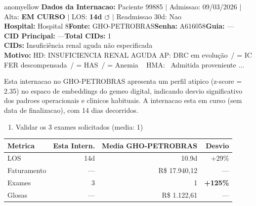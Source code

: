 \documentclass[a4paper,10pt]{article}
\begin{document}
\begin{anomalycard}[Internacao 168228 | GHO-PETROBRAS | MODERADO (z=2.35)]{anomyellow}
\textbf{Dados da Internacao:} Paciente 99885 $\mid$ Admissao: 09/03/2026 $\mid$ Alta: \textcolor{anomorange}{\textbf{EM CURSO}} $\mid$ LOS: \textbf{14d \textcolor{anomorange}{$\circlearrowleft$}} $\mid$ Readmissao 30d: Nao\\
\textbf{Hospital:} Hospital 8\quad\textbf{Fonte:} GHO-PETROBRAS\quad\textbf{Senha:} A616058\quad\textbf{Guia:} ---\\
\textbf{CID Principal:} {\small ---}\quad\textbf{Total CIDs:} 1\\

\textbf{CIDs:} {\scriptsize Insuficiência renal aguda não especificada}\\

\textbf{Motivo:} {\scriptsize HD: INSUFICIENCIA RENAL AGUDA   AP: DRC em evolução / = IC FER descompensada / = HAS / = Anemia    HMA:  Admitida proveniente ...}\\

\vspace{2pt}\begin{tcolorbox}[colback=severityred!20,colframe=anomyellow,title={\textbf{Interpretacao de Negocio}},fonttitle=\bfseries\small,left=4pt,right=4pt,top=3pt,bottom=3pt]
{\small Esta internacao no GHO-PETROBRAS apresenta um perfil atipico (z-score = 2.35) no espaco de embeddings do gemeo digital, indicando desvio significativo dos padroes operacionais e clinicos habituais. A internacao esta em curso (sem data de finalizacao), com 14 dias decorridos.}
\end{tcolorbox}
\begin{tcolorbox}[colback=severityyellow!30,colframe=anomorange,title={\textbf{Recomendacoes Especificas}},fonttitle=\bfseries\small,left=4pt,right=4pt,top=3pt,bottom=3pt]
\begin{enumerate}[nosep,leftmargin=16pt]
\item {\small Validar os 3 exames solicitados (media: 1)}
\end{enumerate}
\end{tcolorbox}
\begin{center}\begin{tabular}{l r r r}\toprule\textbf{Metrica} & \textbf{Esta Intern.} & \textbf{Media GHO-PETROBRAS} & \textbf{Desvio} \\\midrule
LOS & 14d & 10.9d & +29\% \\
Faturamento & --- & R\$ 17.940,12 & --- \\
Exames & 3 & 1 & \textcolor{anomred}{\textbf{+125\%}} \\
Glosas & --- & R\$ 1.122,61 & --- \\
\bottomrule\end{tabular}\end{center}


\end{anomalycard}
\end{document}
